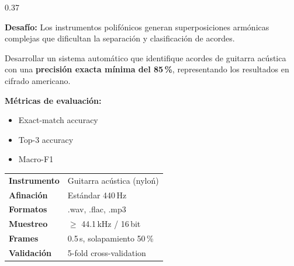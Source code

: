 \documentclass[final]{beamer}
\begin{document}
\begin{frame}[t]{}
\begin{columns}[t,totalwidth=\linewidth]
\begin{column}{0.37\linewidth}
\begin{tcolorbox}[sectionbox, title={$\blacktriangleright$ Resumen del Proyecto}]
\vspace{4pt}
\begin{tcolorbox}[archbox, colframe=accent, colback=accent!5]
  \textbf{\textcolor{accent}{Desaf\'io:}} Los instrumentos polif\'onicos generan
  superposiciones arm\'onicas complejas que dificultan la separaci\'on y
  clasificaci\'on de acordes.
\end{tcolorbox}
\end{tcolorbox}

\vspace{6pt}

\begin{tcolorbox}[sectionbox, title={$\bullet$ Objetivo}]
Desarrollar un sistema autom\'atico que identifique acordes de guitarra ac\'ustica
con una \textbf{precisi\'on exacta m\'inima del 85\,\%}, representando los resultados
en cifrado americano.

\vspace{5pt}
\begin{tcolorbox}[archbox, colframe=accentgold, colback=accentgold!8]
\textbf{M\'etricas de evaluaci\'on:}
\begin{itemize}\setlength\itemsep{1pt}
  \item Exact-match accuracy
  \item Top-3 accuracy
  \item Macro-F1
\end{itemize}
\end{tcolorbox}
\end{tcolorbox}

\vspace{6pt}

\begin{tcolorbox}[sectionbox, title={$\square$ Dataset --- GuitarSet}]
\begin{tabular}{@{}ll@{}}
  \textbf{Instrumento}  & Guitarra ac\'ustica (nylo\'n) \\[2pt]
  \textbf{Afinaci\'on}  & Est\'andar 440\,Hz \\[2pt]
  \textbf{Formatos}     & .wav, .flac, .mp3 \\[2pt]
  \textbf{Muestreo}     & $\geq$ 44.1\,kHz / 16\,bit \\[2pt]
  \textbf{Frames}       & 0.5\,s, solapamiento 50\,\% \\[2pt]
  \textbf{Validaci\'on} & 5-fold cross-validation \\
\end{tabular}
\end{tcolorbox}

\end{column}


\end{columns}
\end{frame}
\end{document}
